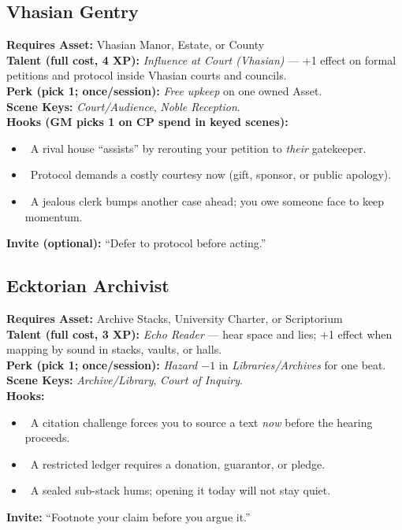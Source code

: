 \documentclass[11pt]{article}
\begin{document}
\subsection*{Vhasian Gentry}
\textbf{Requires Asset:} Vhasian Manor, Estate, or County\\
\textbf{Talent (full cost, 4 XP):} \emph{Influence at Court (Vhasian)} — +1 effect on formal petitions and protocol inside Vhasian courts and councils.\\
\textbf{Perk (pick 1; once/session):} \emph{Free upkeep} on one owned Asset.\\
\textbf{Scene Keys:} \emph{Court/Audience}, \emph{Noble Reception}.\\[2pt]
\textbf{Hooks (GM picks 1 on CP spend in keyed scenes):}
\begin{itemize}
  \item \clubsuit~A rival house “assists” by rerouting your petition to \emph{their} gatekeeper.
  \item \diamondsuit~Protocol demands a costly courtesy now (gift, sponsor, or public apology).
  \item \heartsuit~A jealous clerk bumps another case ahead; you owe someone face to keep momentum.
\end{itemize}
\textbf{Invite (optional):} “Defer to protocol before acting.”

\subsection*{Ecktorian Archivist}
\textbf{Requires Asset:} Archive Stacks, University Charter, or Scriptorium\\
\textbf{Talent (full cost, 3 XP):} \emph{Echo Reader} — hear space and lies; +1 effect when mapping by sound in stacks, vaults, or halls.\\
\textbf{Perk (pick 1; once/session):} \emph{Hazard $-1$} in \emph{Libraries/Archives} for one beat.\\
\textbf{Scene Keys:} \emph{Archive/Library}, \emph{Court of Inquiry}.\\[2pt]
\textbf{Hooks:}
\begin{itemize}
  \item \clubsuit~A citation challenge forces you to source a text \emph{now} before the hearing proceeds.
  \item \diamondsuit~A restricted ledger requires a donation, guarantor, or pledge.
  \item \spadesuit~A sealed sub-stack hums; opening it today will not stay quiet.
\end{itemize}
\textbf{Invite:} “Footnote your claim before you argue it.”
\end{document}
